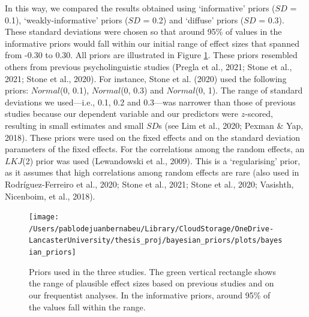 \documentclass[
  12pt,
  man,floatsintext]{apa7}
\begin{document}
In this way, we compared the results obtained using `informative' priors (\(SD\) = 0.1), `weakly-informative' priors (\(SD\) = 0.2) and `diffuse' priors (\(SD\) = 0.3). These standard deviations were chosen so that around 95\% of values in the informative priors would fall within our initial range of effect sizes that spanned from -0.30 to 0.30. All priors are illustrated in Figure \ref{fig:bayesian-priors}. These priors resembled others from previous psycholinguistic studies (Pregla et al., 2021; Stone et al., 2021; Stone et al., 2020). For instance, Stone et al. (2020) used the following priors: \(Normal\)(0, 0.1), \(Normal\)(0, 0.3) and \(Normal\)(0, 1). The range of standard deviations we used---i.e., 0.1, 0.2 and 0.3---was narrower than those of previous studies because our dependent variable and our predictors were \(z\)-scored, resulting in small estimates and small \(SD\)s (see Lim et al., 2020; Pexman \& Yap, 2018). These priors were used on the fixed effects and on the standard deviation parameters of the fixed effects. For the correlations among the random effects, an \(LKJ\)(2) prior was used (Lewandowski et al., 2009). This is a `regularising' prior, as it assumes that high correlations among random effects are rare (also used in Rodríguez-Ferreiro et al., 2020; Stone et al., 2021; Stone et al., 2020; Vasishth, Nicenboim, et al., 2018).

\begin{figure}

{\centering \texttt{[image: /Users/pablodejuanbernabeu/Library/CloudStorage/OneDrive-LancasterUniversity/thesis\_proj/bayesian\_priors/plots/bayesian\_priors]} 

}

\caption{Priors used in the three studies. The green vertical rectangle shows the range of plausible effect sizes based on previous studies and on our frequentist analyses. In the informative priors, around 95\% of the values fall within the range.}\label{fig:bayesian-priors}
\end{figure}
\end{document}

